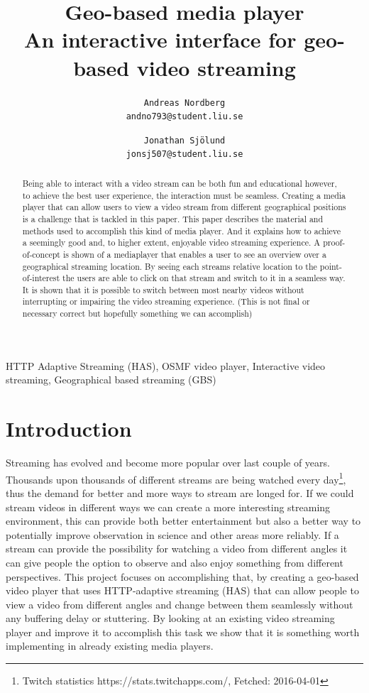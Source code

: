 \documentclass[9pt,a4paper]{acmproc}
\author{
\texttt{Andreas Nordberg}\\
\texttt{andno793@student.liu.se}
  \and
  \texttt{Jonathan Sjölund}\\
  \texttt{jonsj507@student.liu.se}
}
\begin{document}
\title{%
	Geo-based media player \\
	\large An interactive interface for geo-based video streaming}
\maketitle



\begin{abstract}
Being able to interact with a video stream can be both fun and educational however, to achieve the best user experience, the interaction must be seamless. Creating a media player that can allow users to view a video stream from different geographical positions is a challenge that is tackled in this paper. This paper describes the material and methods used to accomplish this kind of media player. And it explains how to achieve a seemingly good and, to higher extent, enjoyable video streaming experience. A proof-of-concept is shown of a mediaplayer that enables a user to see an overview over a geographical streaming location. By seeing each streams relative location to the point-of-interest the users are able to click on that stream and switch to it in a seamless way. It is shown that it is possible to switch between most nearby videos without interrupting or impairing the video streaming experience. (This is not final or necessary correct but hopefully something we can accomplish)

\end{abstract}

\begin{keywords}
HTTP Adaptive Streaming (HAS), OSMF video player, Interactive video streaming, Geographical based streaming (GBS)
\end{keywords}

\section{Introduction} 

Streaming has evolved and become more popular over last couple of years. Thousands upon thousands of different streams are being watched every day\footnote{Twitch statistics https://stats.twitchapps.com/, Fetched: 2016-04-01}, thus the demand for better and more ways to stream are longed for. If we could stream videos in different ways we can create a more interesting streaming environment, this can provide both better entertainment but also a better way to potentially improve observation in science and other areas more reliably. If a stream can provide the possibility for watching a video from different angles it can give people the option to observe and also enjoy something from different perspectives. This project focuses on accomplishing that, by creating a geo-based video player that uses HTTP-adaptive streaming (HAS) that can allow people to view a video from different angles and change between them seamlessly without any buffering delay or stuttering. By looking at an existing video streaming player and improve it to accomplish this task we show that it is something worth implementing in already existing media players.
\end{document}
